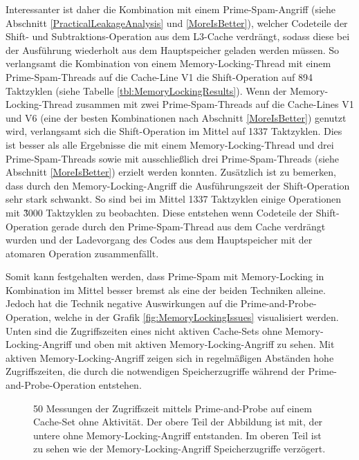 Interessanter ist daher die Kombination mit einem Prime-Spam-Angriff (siehe Abschnitt \ref{PracticalLeakageAnalysis} und \ref{MoreIsBetter}), welcher Codeteile der Shift- und Subtraktions-Operation aus dem L3-Cache verdrängt, sodass diese bei der Ausführung wiederholt aus dem Hauptspeicher geladen werden müssen.
So verlangsamt die Kombination von einem Memory-Locking-Thread mit einem Prime-Spam-Threads auf die Cache-Line V1 die Shift-Operation auf 894 Taktzyklen (siehe Tabelle \ref{tbl:MemoryLockingResults}).
Wenn der Memory-Locking-Thread zusammen mit zwei Prime-Spam-Threads auf die Cache-Lines V1 und V6 (eine der besten Kombinationen nach Abschnitt \ref{MoreIsBetter}) genutzt wird, verlangsamt sich die Shift-Operation im Mittel auf 1337 Taktzyklen.
Dies ist besser als alle Ergebnisse die mit einem Memory-Locking-Thread und drei Prime-Spam-Threads sowie mit ausschließlich drei Prime-Spam-Threads (siehe Abschnitt \ref{MoreIsBetter}) erzielt werden konnten.
Zusätzlich ist zu bemerken, dass durch den Memory-Locking-Angriff die Ausführungszeit der Shift-Operation sehr stark schwankt.
So sind bei im Mittel 1337 Taktzyklen einige Operationen mit \~3000 Taktzyklen zu beobachten.
Diese entstehen wenn Codeteile der Shift-Operation gerade durch den Prime-Spam-Thread aus dem Cache verdrängt wurden und der Ladevorgang des Codes aus dem Hauptspeicher mit der atomaren Operation zusammenfällt.

Somit kann festgehalten werden, dass Prime-Spam mit Memory-Locking in Kombination im Mittel besser bremst als eine der beiden Techniken alleine.
Jedoch hat die Technik negative Auswirkungen auf die Prime-and-Probe-Operation, welche in der Grafik \ref{fig:MemoryLockingIssues} visualisiert werden.
Unten sind die Zugriffszeiten eines nicht aktiven Cache-Sets ohne Memory-Locking-Angriff und oben mit aktiven Memory-Locking-Angriff zu sehen.
Mit aktiven Memory-Locking-Angriff zeigen sich in regelmäßigen Abständen hohe Zugriffszeiten, die durch die notwendigen Speicherzugriffe während der Prime-and-Probe-Operation entstehen.

\label{fig:MemoryLockingIssues}
\begin{figure}[h]
\centering
\begin{scaletikzpicturetowidth}{\textwidth}

\end{scaletikzpicturetowidth}
\caption{50 Messungen der Zugriffszeit mittels Prime-and-Probe auf einem Cache-Set ohne Aktivität. Der obere Teil der Abbildung ist mit, der untere ohne Memory-Locking-Angriff entstanden. Im oberen Teil ist zu sehen wie der Memory-Locking-Angriff Speicherzugriffe verzögert.}
\end{figure}

